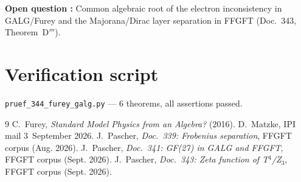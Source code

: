 \textbf{Open question \SM:} Common algebraic root of the electron inconsistency in GALG/Furey
and the Majorana/Dirac layer separation in FFGFT (Doc.~343, Theorem~D$'''$).

\section*{Verification script}
\texttt{pruef\_344\_furey\_galg.py} --- 6 theorems, all assertions passed.

\begin{thebibliography}{9}
 C.~Furey, \textit{Standard Model Physics from an Algebra?} (2016).
 D.~Matzke, IPI mail 3~September 2026.
 J.~Pascher, \textit{Doc.~339: Frobenius separation}, FFGFT corpus (Aug. 2026).
 J.~Pascher, \textit{Doc.~341: GF(27) in GALG and FFGFT}, FFGFT corpus (Sept. 2026).
 J.~Pascher, \textit{Doc.~343: Zeta function of T$^4$/Z$_3$}, FFGFT corpus (Sept. 2026).
\end{thebibliography}
